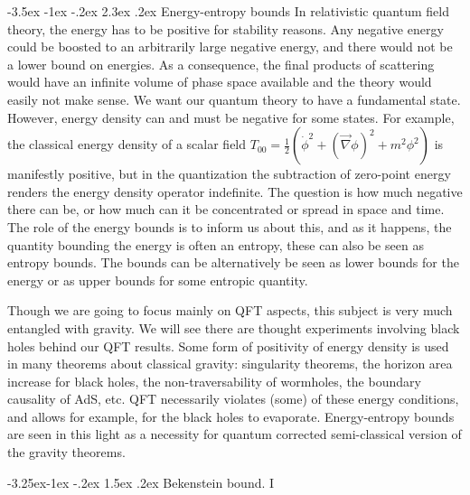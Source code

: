 \documentclass[11pt,a4paper]{article}
\makeatletter
\renewcommand\section{\@startsection {section}{1}{\z@}%
                                 {-3.5ex \@plus -1ex \@minus -.2ex}%
                                   {2.3ex \@plus.2ex}%
                                   {\normalfont\large\bfseries}}
\renewcommand\subsection{\@startsection{subsection}{2}{\z@}%
                                   {-3.25ex\@plus -1ex \@minus -.2ex}%
                                     {1.5ex \@plus .2ex}%
                                     {\normalfont\bfseries}}
\numberwithin{equation}{section}
\makeatother
\begin{document}
\section{Energy-entropy  bounds}
 In relativistic quantum field theory, the energy has to be positive for stability reasons. Any negative energy could be boosted to an arbitrarily large negative energy, and there would not be a lower bound on energies. As a consequence, the final products of scattering would have an infinite volume of phase space available and the theory would easily not make sense. We want our quantum theory to have a fundamental state. However, energy density can and must be negative for some states. For example, the classical energy density of a scalar field $T_{00}=\frac{1}{2}(\dot{\phi}^2+(\vec{\nabla} \phi)^2+m^2\phi^2)$ is manifestly positive, but in the quantization the subtraction of zero-point energy renders the energy density operator indefinite. 
  The question is how much negative there can be, or how much can it be concentrated or spread in space and time. The role of the energy bounds is to inform us about this, and as it happens, the quantity bounding the energy is often an entropy, these can also be seen as entropy bounds. The bounds can be alternatively be seen as lower bounds for the energy or as upper bounds for some entropic quantity. 
   
Though we are going to focus mainly on QFT aspects, this subject is very much entangled with gravity. We will see there are thought experiments involving black holes behind our QFT results. Some form of positivity of energy density is used in many theorems about classical gravity: singularity theorems, the horizon area increase for black holes, the non-traversability of wormholes, the boundary causality of AdS, etc. 
 QFT necessarily violates (some) of these energy conditions, and allows for example, for the black holes to evaporate. Energy-entropy bounds are seen in this light as a necessity for quantum corrected semi-classical version of the gravity theorems. 
 
   

\subsection{Bekenstein bound. I}
\end{document}
